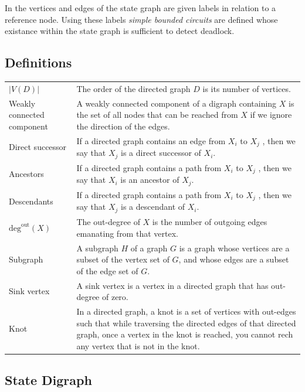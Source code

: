 \documentclass{article}
\begin{document}
In \cite{choetal95} the vertices and edges of the state graph are given labels in relation to a reference node.
Using these labels \textit{simple bounded circuits} are defined whose existance within the state graph is sufficient to detect deadlock.


\subsection{Definitions}

\begin{tabular}{ p{5cm} p{10cm} }
  $\left| V(D) \right|$        & The order of the directed graph $D$ is its number of vertices. \\
  Weakly connected component   & A weakly connected component of a digraph containing $X$ is the set of all nodes that can be reached from $X$ if we ignore the direction of the edges. \\
  Direct successor             & If a directed graph contains an edge from $X_i$ to $X_j$ , then we say that $X_j$ is a direct successor of $X_i$. \\
  Ancestors                    & If a directed graph contains a path from $X_i$ to $X_j$ , then we say that $X_i$ is an ancestor of $X_j$. \\
  Descendants                  & If a directed graph contains a path from $X_i$ to $X_j$ , then we say that $X_j$ is a descendant of $X_i$. \\
  $\text{deg}^{\text{out}}(X)$ & The out-degree of $X$ is the number of outgoing edges emanating from that vertex. \\
  Subgraph                     & A subgraph $H$ of a graph $G$ is a graph whose vertices are a subset of the vertex set of $G$, and whose edges are a subset of the edge set of $G$. \\
  Sink vertex                  & A sink vertex is a vertex in a directed graph that has out-degree of zero.\\
  Knot                         & In a directed graph, a knot is a set of vertices with out-edges such that while traversing the directed edges of that directed graph, once a vertex in the knot is reached, you cannot rech any vertex that is not in the knot.\\
\end{tabular}


\subsection{State Digraph}
\end{document}
